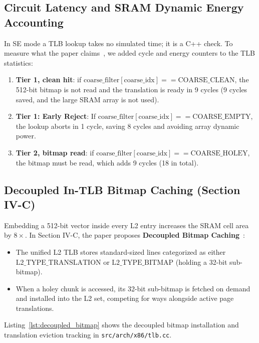 \subsection{Circuit Latency and SRAM Dynamic Energy Accounting}
In SE mode a TLB lookup takes no simulated time; it is a C++ check. To measure what the paper claims~\cite{kwon2020perforated}, we added cycle and energy counters to the TLB statistics:
\begin{enumerate}
    \item \textbf{Tier 1, clean hit}: if $\text{coarse\_filter}[\text{coarse\_idx}] == \text{COARSE\_CLEAN}$, the 512-bit bitmap is not read and the translation is ready in 9 cycles (9 cycles saved, and the large SRAM array is not used).
    \item \textbf{Tier 1: Early Reject}: If $\text{coarse\_filter}[\text{coarse\_idx}] == \text{COARSE\_EMPTY}$, the lookup aborts in 1 cycle, saving 8 cycles and avoiding array dynamic power.
    \item \textbf{Tier 2, bitmap read}: if $\text{coarse\_filter}[\text{coarse\_idx}] == \text{COARSE\_HOLEY}$, the bitmap must be read, which adds 9 cycles (18 in total).
\end{enumerate}

\subsection{Decoupled In-TLB Bitmap Caching (Section IV-C)}
Embedding a 512-bit vector inside every L2 entry increases the SRAM cell area by $8\times$. In Section IV-C, the paper proposes \textbf{Decoupled Bitmap Caching}~\cite{kwon2020perforated}:
\begin{itemize}
    \item The unified L2 TLB stores standard-sized lines categorized as either $\text{L2\_TYPE\_TRANSLATION}$ or $\text{L2\_TYPE\_BITMAP}$ (holding a 32-bit sub-bitmap).
    \item When a holey chunk is accessed, its 32-bit sub-bitmap is fetched on demand and installed into the L2 set, competing for ways alongside active page translations.
\end{itemize}

Listing~\ref{lst:decoupled_bitmap} shows the decoupled bitmap installation and translation eviction tracking in \texttt{src/arch/x86/tlb.cc}.

